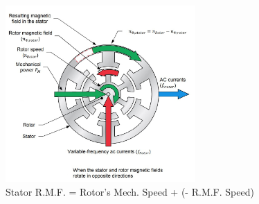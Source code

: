 \documentclass{beamer}
\begin{document}
\begin{frame}{}
    \begin{figure}
        \centering
        \includegraphics[width=2.85in]{imgs/dfigOP opposite.jpg}
        \caption{Stator R.M.F. = Rotor's Mech. Speed +  (- R.M.F. Speed)}
    \end{figure}
\end{frame}
\end{document}
